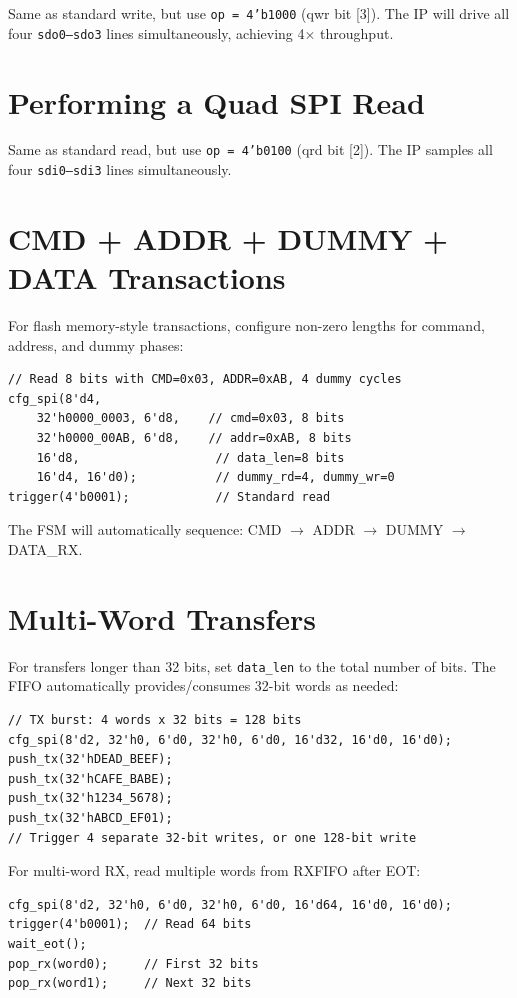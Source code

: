 Same as standard write, but use \texttt{op = 4'b1000} (qwr bit [3]). The IP will drive all four
\texttt{sdo0--sdo3} lines simultaneously, achieving 4$\times$ throughput.

\section{Performing a Quad SPI Read}

Same as standard read, but use \texttt{op = 4'b0100} (qrd bit [2]). The IP samples all four
\texttt{sdi0--sdi3} lines simultaneously.

\section{CMD + ADDR + DUMMY + DATA Transactions}

For flash memory-style transactions, configure non-zero lengths for command, address, and dummy phases:
\begin{lstlisting}
// Read 8 bits with CMD=0x03, ADDR=0xAB, 4 dummy cycles
cfg_spi(8'd4,
    32'h0000_0003, 6'd8,    // cmd=0x03, 8 bits
    32'h0000_00AB, 6'd8,    // addr=0xAB, 8 bits
    16'd8,                   // data_len=8 bits
    16'd4, 16'd0);           // dummy_rd=4, dummy_wr=0
trigger(4'b0001);            // Standard read
\end{lstlisting}

The FSM will automatically sequence: CMD $\rightarrow$ ADDR $\rightarrow$ DUMMY $\rightarrow$ DATA\_RX.

\section{Multi-Word Transfers}

For transfers longer than 32 bits, set \texttt{data\_len} to the total number of bits. The FIFO
automatically provides/consumes 32-bit words as needed:
\begin{lstlisting}
// TX burst: 4 words x 32 bits = 128 bits
cfg_spi(8'd2, 32'h0, 6'd0, 32'h0, 6'd0, 16'd32, 16'd0, 16'd0);
push_tx(32'hDEAD_BEEF);
push_tx(32'hCAFE_BABE);
push_tx(32'h1234_5678);
push_tx(32'hABCD_EF01);
// Trigger 4 separate 32-bit writes, or one 128-bit write
\end{lstlisting}

For multi-word RX, read multiple words from RXFIFO after EOT:
\begin{lstlisting}
cfg_spi(8'd2, 32'h0, 6'd0, 32'h0, 6'd0, 16'd64, 16'd0, 16'd0);
trigger(4'b0001);  // Read 64 bits
wait_eot();
pop_rx(word0);     // First 32 bits
pop_rx(word1);     // Next 32 bits
\end{lstlisting}

